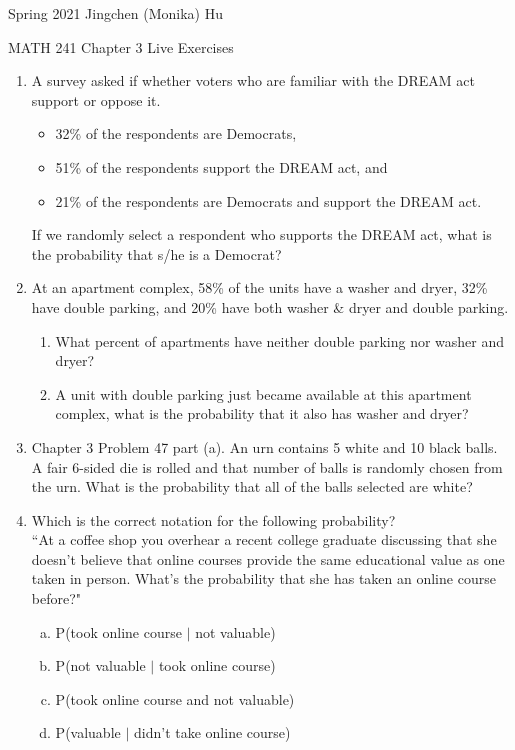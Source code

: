 \documentclass[11pt]{article}
\begin{document}
\enlargethispage{\baselineskip}

Spring 2021 \hfill Jingchen (Monika) Hu\\

\begin{center}
{\huge MATH 241 Chapter 3 Live Exercises}	\\
\end{center}
\vspace{0.5cm}

\begin{enumerate}


\item A survey asked if whether voters who are familiar with the DREAM act support or oppose it.
\begin{itemize}
\item 32\% of the respondents are Democrats,
\item 51\% of the respondents support the DREAM act, and
\item 21\% of the respondents are Democrats and support the DREAM act.
\end{itemize}
If we randomly select a respondent who supports the DREAM act, what is the probability that s/he is a Democrat?
    
\item At an apartment complex, 58\% of the units have a washer and dryer, 32\% have double parking, and 20\% have both washer \& dryer and double parking.
\begin{enumerate}
\item What percent of apartments have neither double parking nor washer and dryer?
\item A unit with double parking just became available at this apartment complex, what is the probability that it also has washer and dryer?
\end{enumerate}

\item Chapter 3 Problem 47 part (a). An urn contains 5 white and 10 black balls. A fair 6-sided die is rolled and that number of balls is randomly chosen from the urn. What is the probability that all of the balls selected are white?

\item Which is the correct notation for the following probability? \\
``At a coffee shop you overhear a recent college graduate discussing that she doesn't believe that online courses provide the same educational value as one taken in person. What's the probability that she has taken an online course before?"
\begin{enumerate}[(a)]
\item P(took online course $|$ not valuable)
\item P(not valuable $|$ took online course)
\item P(took online course and not valuable)
\item P(valuable $|$ didn't take online course)
\end{enumerate}


\end{enumerate}
\end{document}
